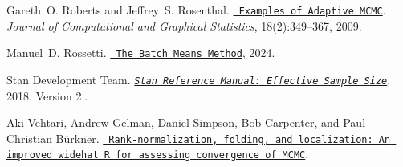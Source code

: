 \begin{DoxyDescription}
\item[\label{citelist_CITEREF_roberts2009adaptive}%
\Hypertarget{citelist_CITEREF_roberts2009adaptive}%
\mbox{[}14\mbox{]}]Gareth~O. Roberts and Jeffrey~S. Rosenthal. \href{http://www.jstor.org/stable/25651249}{\texttt{ Examples of Adaptive MCMC}}. {\itshape Journal of Computational and Graphical Statistics}, 18(2)\+:349--367, 2009.


\item[\label{citelist_CITEREF_rossetti2024batch}%
\Hypertarget{citelist_CITEREF_rossetti2024batch}%
\mbox{[}15\mbox{]}]Manuel~D. Rossetti. \href{https://rossetti.github.io/RossettiArenaBook/ch5-BatchMeansMethod.html}{\texttt{ The Batch Means Method}}, 2024.


\item[\label{citelist_CITEREF_StanManual}%
\Hypertarget{citelist_CITEREF_StanManual}%
\mbox{[}16\mbox{]}]Stan Development Team. \href{https://mc-stan.org/docs/2_18/reference-manual/effective-sample-size-section.html}{\texttt{ {\itshape Stan Reference Manual\+: Effective Sample Size}}}, 2018. Version 2..


\item[\label{citelist_CITEREF_gelman2019}%
\Hypertarget{citelist_CITEREF_gelman2019}%
\mbox{[}17\mbox{]}]Aki Vehtari, Andrew Gelman, Daniel Simpson, Bob Carpenter, and Paul-\/\+Christian Bürkner. \href{https://doi.org/10.48550/arXiv.1903.08008}{\texttt{ Rank-\/normalization, folding, and localization\+: An improved widehat R for assessing convergence of MCMC}}.
\begin{DoxyEnumerate}
\item 
\end{DoxyEnumerate}


\end{DoxyDescription}